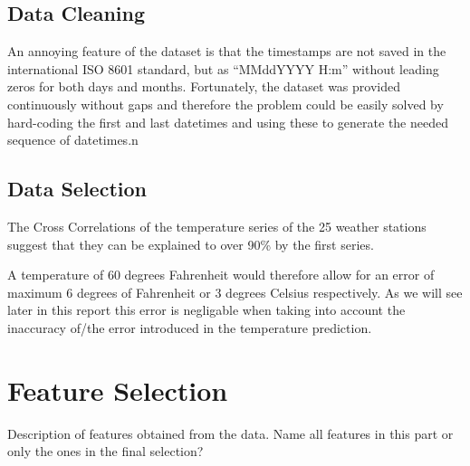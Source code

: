 \documentclass[conference]{IEEEtran}
\begin{document}
\subsection{Data Cleaning}
An annoying feature of the dataset is that the timestamps are not saved in the international ISO 8601 standard, but as ``MMddYYYY H:m'' without leading zeros for both days and months. Fortunately, the dataset was provided continuously without gaps and therefore the problem could be easily solved by hard-coding the first and last datetimes and using these to generate the needed sequence of datetimes.n

\subsection{Data Selection}
The Cross Correlations of the temperature series of the 25 weather stations suggest that they can be explained to over 90\% by the first series.\par
[include correlation plots here]\par
A temperature of 60 degrees Fahrenheit would therefore allow for an error of maximum 6 degrees of Fahrenheit or 3 degrees Celsius respectively. As we will see later in this report this error is negligable when taking into account the inaccuracy of/the error introduced in the temperature prediction.


\section{Feature Selection}
Description of features obtained from the data. 
Name all features in this part or only the ones in the final selection? 
\end{document}
